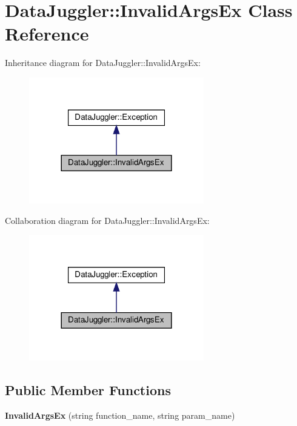 \hypertarget{classDataJuggler_1_1InvalidArgsEx}{}\section{Data\+Juggler\+:\+:Invalid\+Args\+Ex Class Reference}
\label{classDataJuggler_1_1InvalidArgsEx}


Inheritance diagram for Data\+Juggler\+:\+:Invalid\+Args\+Ex\+:\nopagebreak
\begin{figure}[H]
\begin{center}
\leavevmode
\includegraphics[width=216pt]{classDataJuggler_1_1InvalidArgsEx__inherit__graph}
\end{center}
\end{figure}


Collaboration diagram for Data\+Juggler\+:\+:Invalid\+Args\+Ex\+:\nopagebreak
\begin{figure}[H]
\begin{center}
\leavevmode
\includegraphics[width=216pt]{classDataJuggler_1_1InvalidArgsEx__coll__graph}
\end{center}
\end{figure}
\subsection*{Public Member Functions}
\begin{DoxyCompactItemize}
\item 
\mbox{\label{classDataJuggler_1_1InvalidArgsEx_a5ab92559ef9ee96508fa766075e9d80d}} 
{\bfseries Invalid\+Args\+Ex} (string function\+\_\+name, string param\+\_\+name)
\end{DoxyCompactItemize}

